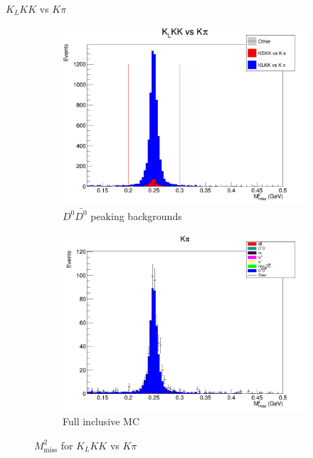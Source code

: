 \documentclass{beamer}
\begin{document}
\begin{frame}{$K_LKK$ vs $K\pi$}
  \begin{figure}
    \centering
    \begin{subfigure}{0.5\textwidth}
      \centering
      \includegraphics[width=\textwidth]{KLKKVersusKpiPeaking.png}
      \caption{$D^0\bar{D^0}$ peaking backgrounds}
    \end{subfigure}%
    \begin{subfigure}{0.5\textwidth}
      \centering
      \includegraphics[width=\textwidth]{KLKKVersusKpiDataInclusiveMC.png}
      \caption{Full inclusive MC}
    \end{subfigure}
    \caption{$M^2_\text{miss}$ for $K_LKK$ vs $K\pi$}
  \end{figure}
\end{frame}
\end{document}
